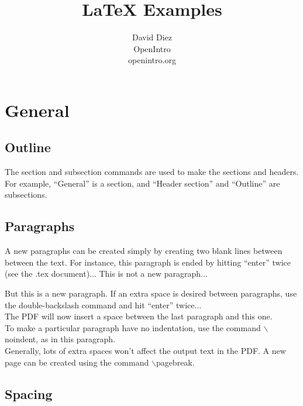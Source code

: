 \documentclass[11pt]{article} %
\title{LaTeX Examples}
\author{David Diez \\
OpenIntro\\
openintro.org}
\date{}
\begin{document}
\maketitle %

\section{General}

\subsection{Outline}
The section and subsection commands are used to make the sections and headers. For example, ``General'' is a section, and ``Header section'' and ``Outline'' are subsections.

\subsection{Paragraphs}

A new paragraphs can be created simply by creating two blank lines between between the text. For instance, this paragraph is ended by hitting ``enter'' twice (see the .tex document)...
This is not a new paragraph...

But this is a new paragraph. If an extra space is desired between paragraphs, use the double-backslash command and hit ``enter'' twice... \\

The PDF will now insert a space between the last paragraph and this one. \\

\noindent To make a particular paragraph have no indentation, use the command $\backslash$noindent, as in this paragraph. \\ %




Generally, lots of extra spaces won't           affect      		 	    the output text     in    the PDF. A new page can be created using the command $\backslash$pagebreak.

\pagebreak

\subsection{Spacing}
\label{spacing}
\end{document}
